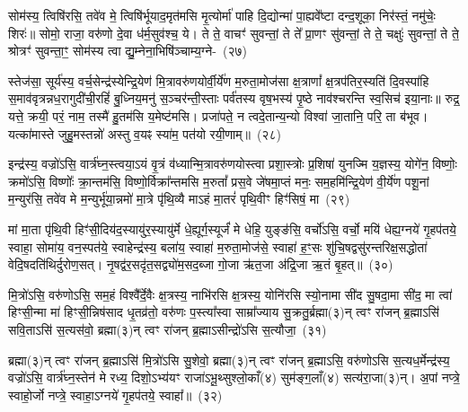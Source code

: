 {\anuvakamend[{अ॒नु॒ष्टुप्त्व॑र्त॒पाश्च॑ सरीसृ॒पेभ्यः॒ स्वाहा᳚}]}%

सोम॑स्य॒ त्विषि॑रसि॒ तवे॑व मे॒ त्विषि॑र्भूयाद॒मृत॑मसि मृ॒त्योर्मा॑ पाहि दि॒द्योन्मा॑ पा॒ह्यवे᳚ष्टा दन्द॒शूका॒ निर॑स्तं॒ नमु॑चेः॒ शिरः॑॥ सोमो॒ राजा॒ वरु॑णो दे॒वा ध॑र्म॒सुव॑श्च॒ ये। ते ते॒ वाचꣳ॑ सुवन्तां॒ ते ते᳚ प्रा॒णꣳ सु॑वन्तां॒ ते ते॒ चक्षुः॑ सुवन्तां॒ ते ते॒ श्रोत्रꣳ॑ सुवन्ता॒ꣳ॒ सोम॑स्य त्वा द्यु॒म्नेना॒भिषि॑ञ्चाम्य॒ग्ने-~(२७)

स्तेज॑सा॒ सूर्य॑स्य॒ वर्च॒सेन्द्र॑स्येन्द्रि॒येण॑ मि॒त्रावरु॑णयोर्वी॒र्ये॑ण म॒रुता॒\-मोज॑सा क्ष॒त्राणां᳚ क्ष॒त्रप॑तिर॒स्यति॑ दि॒वस्पा॑हि स॒माव॑वृत्रन्नध॒रा\-गुदी॑ची॒\-रहिं॑ बु॒ध्निय॒मनु॑ स॒ञ्चर॑न्ती॒स्ताः पर्व॑तस्य वृष॒भस्य॑ पृ॒ष्ठे नाव॑श्चरन्ति स्व॒सिच॑ इया॒नाः॥ रुद्र॒ यत्ते॒ क्रयी॒ परं॒ नाम॒ तस्मै॑ हु॒तम॑सि य॒मेष्ट॑मसि। प्रजा॑पते॒ न त्वदे॒तान्य॒न्यो विश्वा॑ जा॒तानि॒ परि॒ ता ब॑भूव। यत्का॑मास्ते जुहु॒मस्तन्नो॑ अस्तु व॒यꣴ स्या॑म॒ पत॑यो रयी॒णाम्॥~(२८)

{\anuvakamend[{अ॒ग्नेस्तैका॑\-दश च}]}%

इन्द्र॑स्य॒ वज्रो॑\-ऽसि॒ वार्त्र॑घ्न॒स्त्वया॒\-ऽयं वृ॒त्रं व॑ध्यान्मि॒त्रावरु॑ण\-योस्त्वा प्रशा॒स्त्रोः प्र॒शिषा॑ युनज्मि य॒ज्ञस्य॒ योगे॑न॒ विष्णोः॒ क्रमो॑\-ऽसि॒ विष्णोः᳚ क्रा॒न्तम॑सि॒ विष्णो॒र्विक्रा᳚न्तमसि म॒रुतां᳚ प्रस॒वे जे॑षमा॒प्तं मनः॒ सम॒हमि॑न्द्रि॒येण॑ वी॒र्ये॑ण पशू॒नां म॒न्युर॑सि॒ तवे॑व मे म॒न्युर्भू॑या॒न्नमो॑ मा॒त्रे पृ॑थि॒व्यै मा\-ऽहं मा॒तरं॑ पृथि॒वीꣳ हिꣳ॑सिषं॒ मा~(२९)

मां मा॒ता पृ॑थि॒वी हिꣳ॑सी॒दिय॑द॒स्यायु॑र॒स्यायु॑र्मे धे॒ह्यूर्ग॒स्यूर्जं॑ मे धेहि॒ युङ्ङ॑सि॒ वर्चो॑\-ऽसि॒ वर्चो॒ मयि॑ धेह्य॒ग्नये॑ गृ॒हप॑तये॒ स्वाहा॒ सोमा॑य॒ वन॒स्पत॑ये॒ स्वाहेन्द्र॑स्य॒ बला॑य॒ स्वाहा॑ म॒रुता॒मोज॑से॒ स्वाहा॑ ह॒ꣳ॒सः शु॑चि॒षद्वसु॑रन्तरिक्ष॒\-सद्धोता॑ वेदि॒षदति॑थिर्दुरोण॒सत्। नृ॒षद्व॑र॒सदृ॑त॒सद्व्यो॑म॒सद॒ब्जा गो॒जा ऋ॑त॒जा अ॑द्रि॒जा ऋ॒तं बृ॒हत्॥~(३०)

{\anuvakamend[{हि॒ꣳ॒सि॒षं॒ मर्त॒जास्त्रीणि॑ च}]}%

मि॒त्रो॑\-ऽसि॒ वरु॑णो\-ऽसि॒ सम॒हं विश्वै᳚र्दे॒वैः क्ष॒त्रस्य॒ नाभि॑रसि क्ष॒त्रस्य॒ योनि॑रसि स्यो॒नामा सी॑द सु॒षदा॒मा सी॑द॒ मा त्वा॑ हिꣳसी॒न्मा मा॑ हिꣳसी॒न्निष॑साद धृ॒तव्र॑तो॒ वरु॑णः प॒स्त्या᳚स्वा साम्रा᳚ज्याय सु॒क्रतु॒र्ब्रह्मा(३)न् त्वꣳ रा॑जन् ब्र॒ह्मा\-ऽसि॑ सवि॒ता\-ऽसि॑ स॒त्यस॑वो॒ ब्रह्मा(३)न् त्वꣳ रा॑जन् ब्र॒ह्मा\-ऽसीन्द्रो॑\-ऽसि स॒त्यौजा॒~(३१)

ब्रह्मा(३)न् त्वꣳ रा॑जन् ब्र॒ह्मा\-ऽसि॑ मि॒त्रो॑\-ऽसि सु॒शेवो॒ ब्रह्मा(३)न् त्वꣳ रा॑जन् ब्र॒ह्मा\-ऽसि॒ वरु॑णो\-ऽसि स॒त्यध॒र्मेन्द्र॑स्य॒ वज्रो॑\-ऽसि॒ वार्त्र॑घ्न॒स्तेन॑ मे रध्य॒ दिशो॒\-ऽभ्य॑यꣳ राजा॑\-ऽभू॒थ्सुश्लो॒काँ(४) सुम॑ङ्ग॒लाँ(४) सत्य॑रा॒जा(३)न्। अ॒पां नप्त्रे॒ स्वाहो॒र्जो नप्त्रे॒ स्वाहा॒\-ऽग्नये॑ गृ॒हप॑तये॒ स्वाहा᳚॥~(३२)

